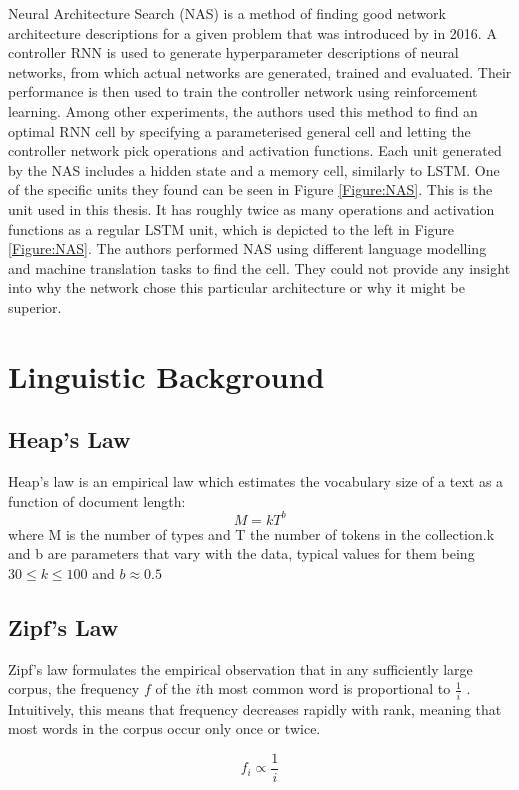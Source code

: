 \documentclass[11pt,a4paper,twoside,openright]{scrbook}
\begin{document}
Neural Architecture Search (NAS) is a method of finding good network architecture descriptions for a given problem that was introduced by \cite{zoph} in 2016. A controller RNN is used to generate hyperparameter descriptions of neural networks, from which actual networks are generated, trained and evaluated. Their performance is then used to train the controller network using reinforcement learning. Among other experiments, the authors used this method to find an optimal RNN cell by specifying a parameterised general cell and letting the controller network pick operations and activation functions. Each unit generated by the NAS includes a hidden state and a memory cell, similarly to LSTM. One of the specific units they found can be seen in Figure \ref{Figure:NAS}. This is the unit used in this thesis. It has roughly twice as many operations and activation functions as a regular LSTM unit, which is depicted to the left in Figure \ref{Figure:NAS}. The authors performed NAS using different language modelling and machine translation tasks to find the cell. They could not provide any insight into why the network chose this particular architecture or why it might be superior. 

\section{Linguistic Background}
\subsection{Heap's Law}
Heap's law is an empirical law which estimates the vocabulary size of a text as a function of document length: \[ M = kT^b \] where M is the number of types and T the number of tokens in the collection.k and b are parameters that vary with the data, typical values for them being  \( 30 \leq k \leq 100\) and \(b \approx 0.5\) \citep{Heaps} \cite{herdan}

\subsection{Zipf's Law}
Zipf's law formulates the empirical observation that in any sufficiently large corpus, the frequency $f$ of the $i$th most common word is proportional to $\frac{1}{i}$ \cite{irbook}. Intuitively, this means that frequency decreases rapidly with rank, meaning that most words in the corpus occur only once or twice. 

\begin{equation}
f_i \propto \frac{1}{i}
\end{equation}
\end{document}

